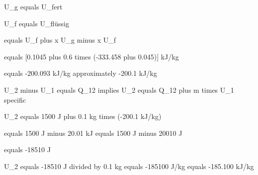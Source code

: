 U_g equals U_fert

U_f equals U_flüssig

equals U_f plus x U_g minus x U_f

equals [0.1045 plus 0.6 times (-333.458 plus 0.045)] kJ/kg

equals -200.093 kJ/kg approximately -200.1 kJ/kg

U_2 minus U_1 equals Q_12 implies U_2 equals Q_12 plus m times U_1 specific

U_2 equals 1500 J plus 0.1 kg times (-200.1 kJ/kg)

equals 1500 J minus 20.01 kJ equals 1500 J minus 20010 J

equals -18510 J

U_2 equals -18510 J divided by 0.1 kg equals -185100 J/kg equals -185.100 kJ/kg